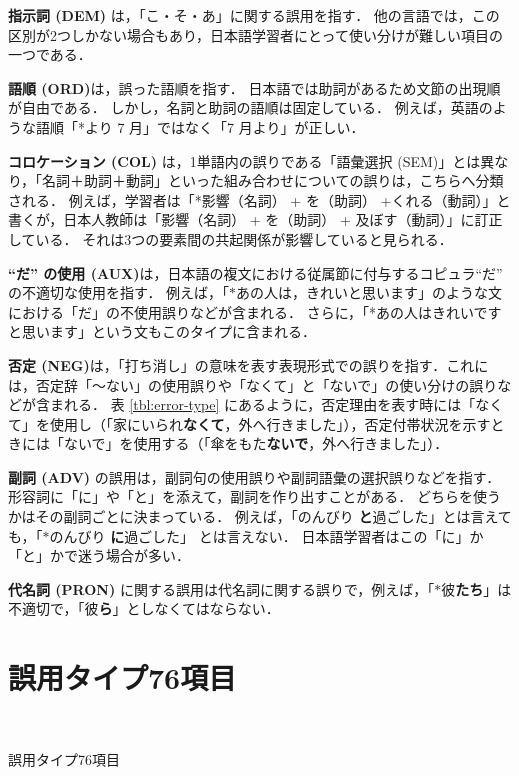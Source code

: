 \documentclass[japanese]{jnlp_1.4}
\begin{document}
{\bf 指示詞 (DEM)} は，「こ・そ・あ」に関する誤用を指す．
他の言語では，この区別が2つしかない場合もあり，日本語学習者にとって使い分けが難しい項目の一つである．

{\bf 語順 (ORD)}は，誤った語順を指す．
日本語では助詞があるため文節の出現順が自由である．
しかし，名詞と助詞の語順は固定している．
例えば，英語のような語順「*より 7 月」ではなく「7 月より」が正しい．

{\bf コロケーション (COL)} は，1単語内の誤りである「語彙選択 (SEM)」とは異なり，「名詞＋助詞＋動詞」といった組み合わせについての誤りは，こちらへ分類される．
例えば，学習者は「*影響（名詞） + を（助詞） +くれる（動詞）」と書くが，日本人教師は「影響（名詞） + を（助詞） + 及ぼす（動詞）」に訂正している．
それは3つの要素間の共起関係が影響していると見られる．

{\bf ``だ'' の使用 (AUX)}は，日本語の複文における従属節に付与するコピュラ``だ'' の不適切な使用を指す．
例えば，「$\ast$あの人は，きれいと思います」のような文における「だ」の不使用誤りなどが含まれる．
さらに，「*あの人はきれいですと思います」という文もこのタイプに含まれる．

{\bf 否定 (NEG)}は，「打ち消し」の意味を表す表現形式での誤りを指す．これには，否定辞「〜ない」の使用誤りや「なくて」と「ないで」の使い分けの誤りなどが含まれる．
表 \ref{tbl:error-type} にあるように，否定理由を表す時には「なくて」を使用し（「家にいられ{\bf なくて}，外へ行きました」），否定付帯状況を示すときには「ないで」を使用する（「傘をもた{\bf ないで}，外へ行きました」）．

{\bf 副詞 (ADV)} の誤用は，副詞句の使用誤りや副詞語彙の選択誤りなどを指す．形容詞に「に」や「と」を添えて，副詞を作り出すことがある．
どちらを使うかはその副詞ごとに決まっている．
例えば，「のんびり {\bf と}過ごした」とは言えても，「$\ast$のんびり {\bf に}過ごした」 とは言えない．
日本語学習者はこの「に」か「と」かで迷う場合が多い．

{\bf 代名詞 (PRON)} に関する誤用は代名詞に関する誤りで，例えば，「$\ast$彼{\bf たち}」は不適切で，「彼{\bf ら}」としなくてはならない．


\section{誤用タイプ76項目}

　　　　　　　　　　　　　　　　　　　　　


\begin{table}[h]
\vspace{-2\Cvs}
\caption{誤用タイプ76項目}
\label{tbl:goyo-type-76-koumoku}

\end{table}
\end{document}
